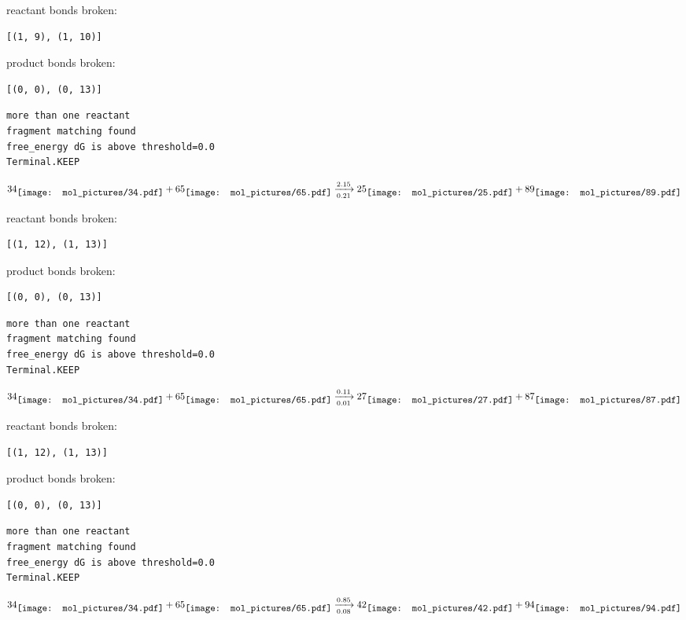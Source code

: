 \documentclass{article}
\begin{document}
reactant bonds broken:\begin{verbatim}
[(1, 9), (1, 10)]
\end{verbatim}
product bonds broken:\begin{verbatim}
[(0, 0), (0, 13)]
\end{verbatim}




\vspace{1cm}
\begin{verbatim}
more than one reactant
fragment matching found
free_energy dG is above threshold=0.0
Terminal.KEEP
\end{verbatim}
$$
34
\raisebox{-.5\height}{\texttt{[image: mol\_pictures/34.pdf]}}
+
65
\raisebox{-.5\height}{\texttt{[image: mol\_pictures/65.pdf]}}
\xrightarrow[0.21]{2.15}
25
\raisebox{-.5\height}{\texttt{[image: mol\_pictures/25.pdf]}}
+
89
\raisebox{-.5\height}{\texttt{[image: mol\_pictures/89.pdf]}}
$$


reactant bonds broken:\begin{verbatim}
[(1, 12), (1, 13)]
\end{verbatim}
product bonds broken:\begin{verbatim}
[(0, 0), (0, 13)]
\end{verbatim}




\vspace{1cm}
\begin{verbatim}
more than one reactant
fragment matching found
free_energy dG is above threshold=0.0
Terminal.KEEP
\end{verbatim}
$$
34
\raisebox{-.5\height}{\texttt{[image: mol\_pictures/34.pdf]}}
+
65
\raisebox{-.5\height}{\texttt{[image: mol\_pictures/65.pdf]}}
\xrightarrow[0.01]{0.11}
27
\raisebox{-.5\height}{\texttt{[image: mol\_pictures/27.pdf]}}
+
87
\raisebox{-.5\height}{\texttt{[image: mol\_pictures/87.pdf]}}
$$


reactant bonds broken:\begin{verbatim}
[(1, 12), (1, 13)]
\end{verbatim}
product bonds broken:\begin{verbatim}
[(0, 0), (0, 13)]
\end{verbatim}




\vspace{1cm}
\begin{verbatim}
more than one reactant
fragment matching found
free_energy dG is above threshold=0.0
Terminal.KEEP
\end{verbatim}
$$
34
\raisebox{-.5\height}{\texttt{[image: mol\_pictures/34.pdf]}}
+
65
\raisebox{-.5\height}{\texttt{[image: mol\_pictures/65.pdf]}}
\xrightarrow[0.08]{0.85}
42
\raisebox{-.5\height}{\texttt{[image: mol\_pictures/42.pdf]}}
+
94
\raisebox{-.5\height}{\texttt{[image: mol\_pictures/94.pdf]}}
$$
\end{document}
